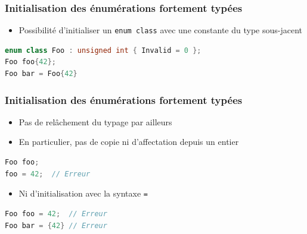 \documentclass[C++.tex]{subfiles}
\begin{document}
\begin{frame}[fragile]
	\frametitle{Initialisation des énumérations fortement typées}
	\begin{itemize}
		\item Possibilité d'initialiser un \lstinline|enum class| avec une constante du type sous-jacent
	\end{itemize}

	\begin{lstlisting}[language=C++]
enum class Foo : unsigned int { Invalid = 0 };
Foo foo{42};
Foo bar = Foo{42}\end{lstlisting}
\end{frame}

\begin{frame}[fragile]
	\frametitle{Initialisation des énumérations fortement typées}
	\begin{itemize}
		\item Pas de relâchement du typage par ailleurs
		\item En particulier, pas de copie ni d'affectation depuis un entier
	\end{itemize}

	\begin{lstlisting}[language=C++]
Foo foo;
foo = 42;  // Erreur\end{lstlisting}

	\begin{itemize}
		\item Ni d'initialisation avec la syntaxe \lstinline|=|
	\end{itemize}

	\begin{lstlisting}[language=C++]
Foo foo = 42;  // Erreur
Foo bar = {42} // Erreur\end{lstlisting}
\end{frame}
\end{document}
